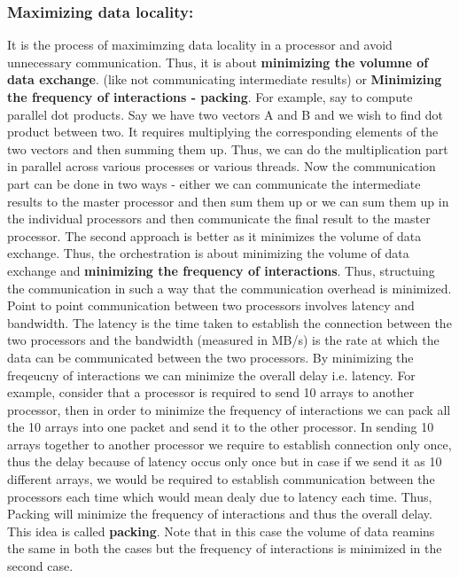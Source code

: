 \documentclass[12pt]{article}
\begin{document}
\subsubsection{Maximizing data locality: }
It is the process of maximimzing data locality in a processor and avoid unnecessary communication. Thus, it is about \textbf{minimizing the volumne of data exchange}.
(like not communicating intermediate results) or \textbf{Minimizing the frequency of interactions - packing}.
For example, say to compute parallel dot products. Say we have two vectors A and B and we wish to find dot product between two. It requires 
multiplying the corresponding elements of the two vectors and then summing them up. Thus, we can do the multiplication part in parallel across various processes or various threads.
Now the communication part can be done in two ways - either we can communicate the intermediate results to the master processor and then sum them up or we can sum them up in the individual processors and then communicate the final result to the master processor.
The second approach is better as it minimizes the volume of data exchange. Thus, the orchestration is about minimizing the volume of data exchange and \textbf{minimizing the frequency of interactions}. Thus, structuing the communication in such a way that the communication overhead is minimized.
Point to point communication between two processors involves latency and bandwidth. The latency is the time taken to establish the connection between the two processors and the bandwidth (measured in MB/s) is the rate at which the data can be communicated between the two processors. By minimizing the freqeucny of interactions we can minimize the overall delay i.e. latency.
For example, consider that a processor is required to send 10 arrays to another processor, then in order to minimize the frequency of interactions 
we can pack all the 10 arrays into one packet and send it to the other processor. In sending 10 arrays together to another processor we require to establish connection only once, thus the delay because of latency
occus only once but in case if we send it as 10 different arrays, we would be required to establish communication between the processors each time which would mean dealy due to latency each time. 
Thus, Packing will minimize the frequency of interactions and thus the overall delay. This idea is called 
\textbf{packing}. Note that in this case the volume of data reamins the same in both the cases 
but the frequency of interactions is minimized in the second case.
\end{document}
